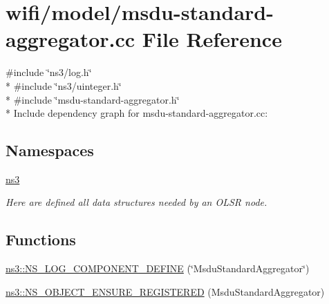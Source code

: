 \hypertarget{msdu-standard-aggregator_8cc}{}\section{wifi/model/msdu-\/standard-\/aggregator.cc File Reference}
\label{msdu-standard-aggregator_8cc}
{\ttfamily \#include \char`\"{}ns3/log.\+h\char`\"{}}\\*
{\ttfamily \#include \char`\"{}ns3/uinteger.\+h\char`\"{}}\\*
{\ttfamily \#include \char`\"{}msdu-\/standard-\/aggregator.\+h\char`\"{}}\\*
Include dependency graph for msdu-\/standard-\/aggregator.cc\+:
\subsection*{Namespaces}
\begin{DoxyCompactItemize}
\item 
 \hyperlink{namespacens3}{ns3}
\begin{DoxyCompactList}\small\item\em Here are defined all data structures needed by an O\+L\+SR node. \end{DoxyCompactList}\end{DoxyCompactItemize}
\subsection*{Functions}
\begin{DoxyCompactItemize}
\item 
\hyperlink{namespacens3_a135bbfaa7eb095829e54e35e3b0ff953}{ns3\+::\+N\+S\+\_\+\+L\+O\+G\+\_\+\+C\+O\+M\+P\+O\+N\+E\+N\+T\+\_\+\+D\+E\+F\+I\+NE} (\char`\"{}Msdu\+Standard\+Aggregator\char`\"{})
\item 
\hyperlink{namespacens3_a6fc00c90b71719a20d5757fad4a2bb20}{ns3\+::\+N\+S\+\_\+\+O\+B\+J\+E\+C\+T\+\_\+\+E\+N\+S\+U\+R\+E\+\_\+\+R\+E\+G\+I\+S\+T\+E\+R\+ED} (Msdu\+Standard\+Aggregator)
\end{DoxyCompactItemize}
